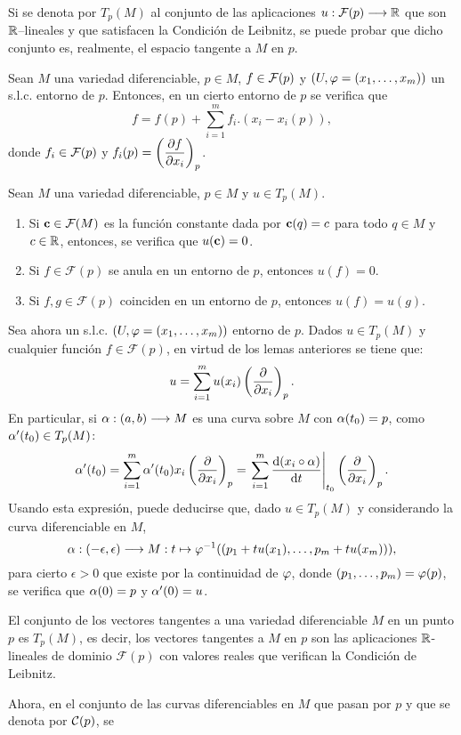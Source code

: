 \documentclass[cursovd_portada.tex]{subfiles}
\begin{document}
\hs Si se denota por $T_p(M)$ al conjunto de las aplicaciones $u:\mathcal{F}(p)\longrightarrow\mathbb{R}$ que son $\mathbb{R}$--lineales y que
satisfacen la Condición de Leibnitz, se puede probar que dicho conjunto es, realmente, el espacio tangente a $M$
en $p$.
\begin{lemma}
Sean $M$ una variedad diferenciable, $p\in M$, $f\in{\cal F}(p)$ y $(U,\varphi=(x_1,\dots ,x_m))$ un s.l.c. entorno de
$p$. Entonces, en un cierto entorno de $p$ se verifica que
$$f=f(p)+\sum_{i=1}^mf_i.(x_i-x_i(p)),$$
donde $f_i\in{\cal F}(p)$ y $f_i(p)=\left(\displaystyle{\frac{\partial f}{\partial x_i}}\right)_p$.
\end{lemma}
\begin{lemma} Sean $M$ una variedad diferenciable, $p\in M$ y $u\in T_p(M)$.
\begin{enumerate}
\item Si ${\bf c}\in{\cal F}(M)$ es la función constante dada por ${\bf c}(q)=c$ para todo $q\in M$ y $c\in\mathbb{R}$,
entonces, se verifica que $u({\bf c})=0$.
\item Si $f\in\mathcal{F}(p)$ se anula en un entorno de $p$, entonces $u(f)=0$.
\item Si $f,g\in\mathcal{F}(p)$ coinciden en un entorno de $p$, entonces $u(f)=u(g)$.
\end{enumerate}
\end{lemma}
Sea ahora un s.l.c. $(U,\varphi=(x_1,\dots ,x_m))$ entorno de $p$. Dados $u\in T_p(M)$ y cualquier función
$f\in\mathcal{F}(p)$, en virtud de los lemas anteriores se tiene que:
$$u=\sum_{i=1}^mu(x_i)\left(\displaystyle{\frac{\partial}{\partial x_i}}\right)_p.$$
\hs En particular, si $\alpha:(a,b)\longrightarrow M$ es una curva sobre $M$ con $\alpha(t_0)=p$, como $\alpha'(t_0)\in T_p(M)$:
$$\alpha'(t_0)=\sum_{i=1}^m\alpha'(t_0)x_i\left(\displaystyle{\frac{\partial}{\partial x_i}}\right)_p=
\left.\sum_{i=1}^m\displaystyle{\frac{{\rm d} (x_i\circ\alpha)}{{\rm d} t}}\right|_{t_0}\left(\displaystyle{\frac{\partial}{\partial x_i}}\right)_p.$$ \hs Usando esta expresión, puede
deducirse que, dado $u\in T_p(M)$ y considerando la curva diferenciable en $M$,
$$\alpha:(-\epsilon,\epsilon)\longrightarrow M:t\mapsto \varphi^{-1}((p_1+tu(x_1),\dots ,p_m+tu(x_m))),$$
para cierto $\epsilon>0$ que existe por la continuidad de $\varphi$, donde $(p_1,\dots ,p_m)=\varphi(p)$, se verifica que
$\alpha(0)=p$ y $\alpha'(0)=u$.
\begin{teorema}
El conjunto de los vectores tangentes a una variedad diferenciable $M$ en un punto $p$ es $T_p(M)$, es decir, los
vectores tangentes a $M$ en $p$ son las aplicaciones $\mathbb{R}$-lineales de dominio $\mathcal{F}(p)$ con valores reales
que verifican la Condición de Leibnitz.
\end{teorema}
Ahora, en el conjunto de las curvas diferenciables en $M$ que pasan por $p$ y que se denota por ${\cal C}(p)$, se
\end{document}

